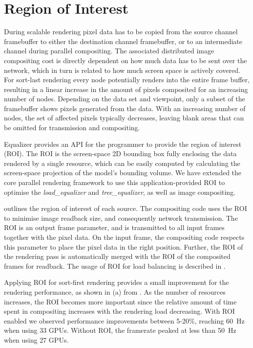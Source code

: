\section{Region of Interest}

During scalable rendering pixel data has to be copied from the source channel
framebuffer to either the destination channel framebuffer, or to an
intermediate channel during parallel compositing. The associated distributed
image compositing cost is directly dependent on how much data has to be sent
over the network, which in turn is related to how much screen space is actively
covered. For sort-last rendering every node potentially renders into the entire
frame buffer, resulting in a linear increase in the amount of pixels composited
for an increasing number of nodes. Depending on the data set and
viewpoint, only a subset of the framebuffer shows pixels generated from the
data. With an increasing number of nodes, the set of affected pixels typically
decreases, leaving blank areas that can be omitted for transmission and
compositing.

Equalizer provides an API for the programmer to provide the region of interest
(ROI). The ROI is the screen-space 2D bounding box fully enclosing the data
rendered by a single resource, which can be easily computed by calculating the
screen-space projection of the model's bounding volume. We have extended the
core parallel rendering framework to use this application-provided ROI to
optimise the {\em load\_equalizer} and {\em tree\_equalizer}, as well as image compositing.

 outlines the region of interest of each source. The compositing
code uses the ROI to minimise image readback size, and consequently network
transmission. The ROI is an output frame parameter, and is transmitted to all
input frames together with the pixel data. On the input frame, the compositing
code respects this parameter to place the pixel data in the right position.
Further, the ROI of the rendering pass is automatically merged with the ROI
of the composited frames for readback. The usage of ROI for load balancing is
described in .

Applying ROI for sort-first rendering provides a small improvement for the
rendering performance, as shown in (a) from \cite{EBAHMP:12}. As the
number of resources increases, the ROI becomes more important since the
relative amount of time spent in compositing increases with the rendering load
decreasing. With ROI enabled we observed performance improvements between
5-20\%, reaching 60~Hz when using 33 GPUs. Without ROI, the framerate peaked at
less than 50~Hz when using 27 GPUs.

